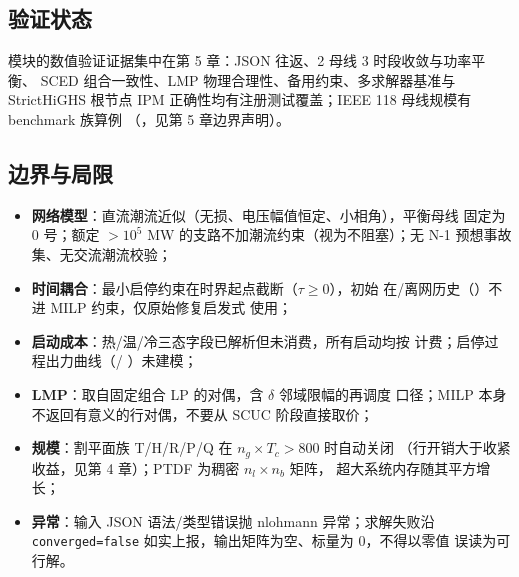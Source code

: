 \documentclass{ctexart}
\begin{document}
\subsection{验证状态}

模块的数值验证证据集中在第 5 章：JSON 往返、2 母线 3 时段收敛与功率平衡、
SCED 组合一致性、LMP 物理合理性、备用约束、多求解器基准与 StrictHiGHS
根节点 IPM 正确性均有注册测试覆盖；IEEE 118 母线规模有 benchmark 族算例
（，见第 5 章边界声明）。

\subsection{边界与局限}

\begin{boundarynote}
\begin{itemize}
  \item \textbf{网络模型}：直流潮流近似（无损、电压幅值恒定、小相角），平衡母线
        固定为 0 号；额定 $>10^5$ MW 的支路不加潮流约束（视为不阻塞）；无 N-1
        预想事故集、无交流潮流校验；
  \item \textbf{时间耦合}：最小启停约束在时界起点截断（$\tau\ge 0$），初始
        在/离网历史（）不进 MILP 约束，仅原始修复启发式
        使用；
  \item \textbf{启动成本}：热/温/冷三态字段已解析但未消费，所有启动均按
         计费；启停过程出力曲线（/
        ）未建模；
  \item \textbf{LMP}：取自固定组合 LP 的对偶，含 $\delta$ 邻域限幅的再调度
        口径；MILP 本身不返回有意义的行对偶，不要从 SCUC 阶段直接取价；
  \item \textbf{规模}：割平面族 T/H/R/P/Q 在 $n_g \times T_c > 800$ 时自动关闭
        （行开销大于收紧收益，见第 4 章）；PTDF 为稠密 $n_l \times n_b$ 矩阵，
        超大系统内存随其平方增长；
  \item \textbf{异常}：输入 JSON 语法/类型错误抛 nlohmann 异常；求解失败沿
        \texttt{converged=false} 如实上报，输出矩阵为空、标量为 0，不得以零值
        误读为可行解。
\end{itemize}
\end{boundarynote}


\end{document}
